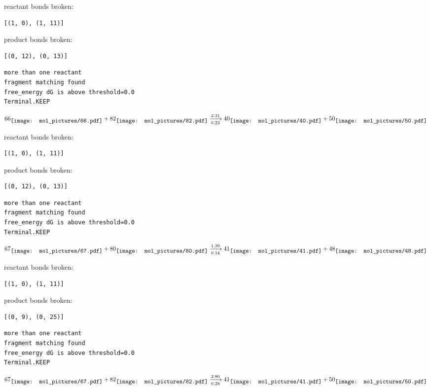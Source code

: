 \documentclass{article}
\begin{document}
reactant bonds broken:\begin{verbatim}
[(1, 0), (1, 11)]
\end{verbatim}
product bonds broken:\begin{verbatim}
[(0, 12), (0, 13)]
\end{verbatim}




\vspace{1cm}
\begin{verbatim}
more than one reactant
fragment matching found
free_energy dG is above threshold=0.0
Terminal.KEEP
\end{verbatim}
$$
66
\raisebox{-.5\height}{\texttt{[image: mol\_pictures/66.pdf]}}
+
82
\raisebox{-.5\height}{\texttt{[image: mol\_pictures/82.pdf]}}
\xrightarrow[0.23]{2.31}
40
\raisebox{-.5\height}{\texttt{[image: mol\_pictures/40.pdf]}}
+
50
\raisebox{-.5\height}{\texttt{[image: mol\_pictures/50.pdf]}}
$$


reactant bonds broken:\begin{verbatim}
[(1, 0), (1, 11)]
\end{verbatim}
product bonds broken:\begin{verbatim}
[(0, 12), (0, 13)]
\end{verbatim}




\vspace{1cm}
\begin{verbatim}
more than one reactant
fragment matching found
free_energy dG is above threshold=0.0
Terminal.KEEP
\end{verbatim}
$$
67
\raisebox{-.5\height}{\texttt{[image: mol\_pictures/67.pdf]}}
+
80
\raisebox{-.5\height}{\texttt{[image: mol\_pictures/80.pdf]}}
\xrightarrow[0.14]{1.39}
41
\raisebox{-.5\height}{\texttt{[image: mol\_pictures/41.pdf]}}
+
48
\raisebox{-.5\height}{\texttt{[image: mol\_pictures/48.pdf]}}
$$


reactant bonds broken:\begin{verbatim}
[(1, 0), (1, 11)]
\end{verbatim}
product bonds broken:\begin{verbatim}
[(0, 9), (0, 25)]
\end{verbatim}




\vspace{1cm}
\begin{verbatim}
more than one reactant
fragment matching found
free_energy dG is above threshold=0.0
Terminal.KEEP
\end{verbatim}
$$
67
\raisebox{-.5\height}{\texttt{[image: mol\_pictures/67.pdf]}}
+
82
\raisebox{-.5\height}{\texttt{[image: mol\_pictures/82.pdf]}}
\xrightarrow[0.28]{2.80}
41
\raisebox{-.5\height}{\texttt{[image: mol\_pictures/41.pdf]}}
+
50
\raisebox{-.5\height}{\texttt{[image: mol\_pictures/50.pdf]}}
$$
\end{document}
